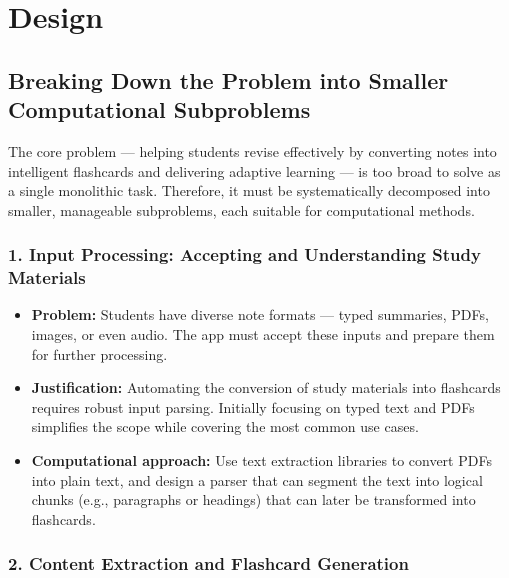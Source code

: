 \documentclass[a4paper,12pt]{article}
\begin{document}
\section{Design}

\subsection{Breaking Down the Problem into Smaller Computational Subproblems}

The core problem — helping students revise effectively by converting notes into intelligent flashcards and delivering adaptive learning — is too broad to solve as a single monolithic task. Therefore, it must be systematically decomposed into smaller, manageable subproblems, each suitable for computational methods.

\subsubsection*{1. Input Processing: Accepting and Understanding Study Materials}

\begin{itemize}
    \item \textbf{Problem:} Students have diverse note formats — typed summaries, PDFs, images, or even audio. The app must accept these inputs and prepare them for further processing.
    \item \textbf{Justification:} Automating the conversion of study materials into flashcards requires robust input parsing. Initially focusing on typed text and PDFs simplifies the scope while covering the most common use cases.
    \item \textbf{Computational approach:} Use text extraction libraries to convert PDFs into plain text, and design a parser that can segment the text into logical chunks (e.g., paragraphs or headings) that can later be transformed into flashcards.
\end{itemize}

\subsubsection*{2. Content Extraction and Flashcard Generation}
\end{document}
